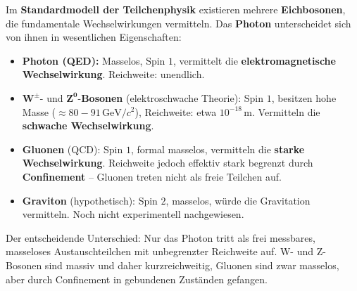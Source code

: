 Im \textbf{Standardmodell der Teilchenphysik} existieren mehrere \textbf{Eichbosonen}, die fundamentale Wechselwirkungen vermitteln.  
Das \textbf{Photon} unterscheidet sich von ihnen in wesentlichen Eigenschaften:

\begin{itemize}
	\item \textbf{Photon (QED):} Masselos, Spin \(1\), vermittelt die \textbf{elektromagnetische Wechselwirkung}.  
	Reichweite: unendlich.
	
	\item \(\mathbf{W^\pm}\)- und \(\mathbf{Z^0}\)-\textbf{Bosonen} (elektroschwache Theorie):  
	Spin \(1\), besitzen hohe Masse (\(\approx 80{-}91\,\mathrm{GeV}/c^2\)), Reichweite: etwa \(10^{-18}\,\mathrm{m}\).  
	Vermitteln die \textbf{schwache Wechselwirkung}.
	
	\item \textbf{Gluonen} (QCD):  
	Spin \(1\), formal masselos, vermitteln die \textbf{starke Wechselwirkung}.  
	Reichweite jedoch effektiv stark begrenzt durch \textbf{Confinement} – Gluonen treten nicht als freie Teilchen auf.
	
	\item \textbf{Graviton} (hypothetisch):  
	Spin \(2\), masselos, würde die Gravitation vermitteln.  
	Noch nicht experimentell nachgewiesen.
\end{itemize}

Der entscheidende Unterschied:  
Nur das Photon tritt als frei messbares, masseloses Austauschteilchen mit unbegrenzter Reichweite auf.  
W- und Z-Bosonen sind massiv und daher kurzreichweitig, Gluonen sind zwar masselos, aber durch Confinement in gebundenen Zuständen gefangen.
\medskip
\begin{tcolorbox}[hinweisbox, title=Vergleich der Eichbosonen]
	\label{box:eichbosonen_vergleich}
	\small
	
	
\end{tcolorbox}




